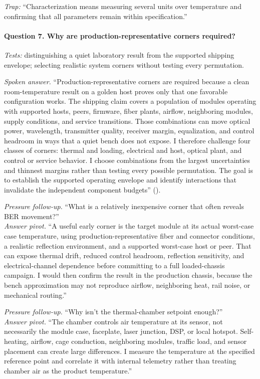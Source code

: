 \textit{Trap:} ``Characterization means measuring several units over
temperature and confirming that all parameters remain within specification.''

\paragraph{Question 7. Why are production-representative corners required?}
\textit{Tests:} distinguishing a quiet laboratory result from the supported
shipping envelope; selecting realistic system corners without testing every
permutation.

\textit{Spoken answer.}
``Production-representative corners are required because a clean
room-temperature result on a golden host proves only that one favorable
configuration works. The shipping claim covers a population of modules
operating with supported hosts, peers, firmware, fiber plants, airflow,
neighboring modules, supply conditions, and service transitions. Those
combinations can move optical power, wavelength, transmitter quality, receiver
margin, equalization, and control headroom in ways that a quiet bench does not
expose. I therefore challenge four classes of corners: thermal and loading,
electrical and host, optical plant, and control or service behavior. I choose
combinations from the largest uncertainties and thinnest margins rather than
testing every possible permutation. The goal is to establish the supported
operating envelope and identify interactions that invalidate the independent
component budgets''
().

\textit{Pressure follow-up.} ``What is a relatively inexpensive corner that often
reveals BER movement?''\\
\textit{Answer pivot.} ``A useful early corner is the target module at its
actual worst-case case temperature, using production-representative fiber and
connector conditions, a realistic reflection environment, and a supported
worst-case host or peer. That can expose thermal drift, reduced control
headroom, reflection sensitivity, and electrical-channel dependence before
committing to a full loaded-chassis campaign. I would then confirm the result
in the production chassis, because the bench approximation may not reproduce
airflow, neighboring heat, rail noise, or mechanical routing.''

\textit{Pressure follow-up.} ``Why isn't the thermal-chamber setpoint
enough?''\\
\textit{Answer pivot.} ``The chamber controls air temperature at its sensor, not
necessarily the module case, faceplate, laser junction, DSP, or local hotspot.
Self-heating, airflow, cage conduction, neighboring modules, traffic load, and
sensor placement can create large differences. I measure the temperature at the
specified reference point and correlate it with internal telemetry rather than
treating chamber air as the product temperature.''

